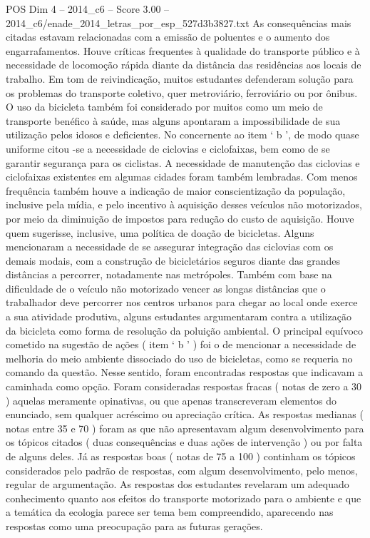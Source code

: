 \begin{textsample}{POS Dim 4 – 2014\_c6 – Score 3.00 – 2014\_c6/enade\_2014\_letras\_por\_esp\_527d3b3827.txt}
As consequências mais citadas estavam relacionadas com a emissão de poluentes e o aumento dos engarrafamentos.
Houve críticas frequentes à qualidade do transporte público e à necessidade de locomoção rápida diante da distância das residências aos locais de trabalho.
Em tom de reivindicação, muitos estudantes defenderam solução para os problemas do transporte coletivo, quer metroviário, ferroviário ou por ônibus.
O uso da bicicleta também foi considerado por muitos como um meio de transporte benéfico à saúde, mas alguns apontaram a impossibilidade de sua utilização pelos idosos e deficientes.
No concernente ao item ‘ b ’, de modo quase uniforme citou -se a necessidade de ciclovias e ciclofaixas, bem como de se garantir segurança para os ciclistas.
A necessidade de manutenção das ciclovias e ciclofaixas existentes em algumas cidades foram também lembradas.
Com menos frequência também houve a indicação de maior conscientização da população, inclusive pela mídia, e pelo incentivo à aquisição desses veículos não motorizados, por meio da diminuição de impostos para redução do custo de aquisição.
Houve quem sugerisse, inclusive, uma política de doação de bicicletas.
Alguns mencionaram a necessidade de se assegurar integração das ciclovias com os demais modais, com a construção de bicicletários seguros diante das grandes distâncias a percorrer, notadamente nas metrópoles.
Também com base na dificuldade de o veículo não motorizado vencer as longas distâncias que o trabalhador deve percorrer nos centros urbanos para chegar ao local onde exerce a sua atividade produtiva, alguns estudantes argumentaram contra a utilização da bicicleta como forma de resolução da poluição ambiental.
O principal equívoco cometido na sugestão de ações ( item ‘ b ’ ) foi o de mencionar a necessidade de melhoria do meio ambiente dissociado do uso de bicicletas, como se requeria no comando da questão.
Nesse sentido, foram encontradas respostas que indicavam a caminhada como opção.
Foram consideradas respostas fracas ( notas de zero a 30 ) aquelas meramente opinativas, ou que apenas transcreveram elementos do enunciado, sem qualquer acréscimo ou apreciação crítica.
As respostas medianas ( notas entre 35 e 70 ) foram as que não apresentavam algum desenvolvimento para os tópicos citados ( duas consequências e duas ações de intervenção ) ou por falta de alguns deles.
Já as respostas boas ( notas de 75 a 100 ) continham os tópicos considerados pelo padrão de respostas, com algum desenvolvimento, pelo menos, regular de argumentação.
As respostas dos estudantes revelaram um adequado conhecimento quanto aos efeitos do transporte motorizado para o ambiente e que a temática da ecologia parece ser tema bem compreendido, aparecendo nas respostas como uma preocupação para as futuras gerações.

\end{textsample}
